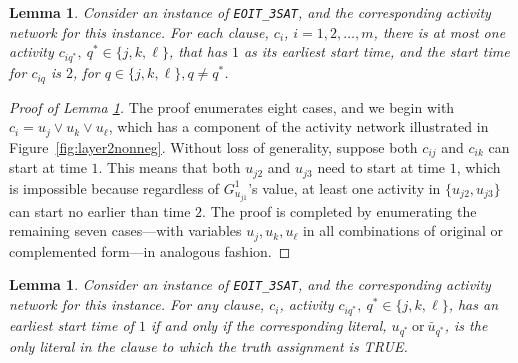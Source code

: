 \documentclass[11pt]{article}
\newtheorem{lemma}[theorem]{Lemma}
\begin{document}
	\begin{lemma} \label{lemma:onlyOne}
		Consider an instance of \verb|EOIT_3SAT|, and the corresponding activity network for this instance.
		For each clause, \(c_i\), 
		\(i = 1,2,\dots,m\), there is at most one activity \(c_{iq^*},\ q^* \in \{j,k,\ell\}\), that has $1$ as its earliest start time, and the start time for \(c_{iq}\) is \(2\), for \(q \in \{j,k,\ell\}, q \neq q^*\).
	\end{lemma}
	\begin{proof}[Proof of Lemma \ref{lemma:onlyOne}]
		The proof enumerates eight cases, and we begin with $c_i=u_j \vee u_k \vee u_\ell$, which has a component of the activity network illustrated in Figure~\ref{fig:layer2nonneg}. Without loss of generality, suppose both \(c_{ij}\) and \(c_{ik}\) can start at time \(1\). This means that both \(u_{j2}\) and \(u_{j3}\) need to start at time \(1\), which is impossible because regardless of \(G^1_{u_{j1}}\)'s value, at least one activity in \(\{u_{j2},u_{j3}\}\) can start no earlier than time \(2\). The proof is completed by enumerating the remaining seven cases---with variables $u_j, u_k, u_\ell$ in all combinations of original or complemented form---in analogous fashion.
	\end{proof}
	\begin{lemma} \label{lemma:iff}
		Consider an instance of \verb|EOIT_3SAT|, and the corresponding activity network for this instance.
		For any clause, \(c_i\), 
		activity \(c_{iq^*},\ q^* \in \{j,k,\ell\}\), has an earliest start time of \(1\) if and only if the corresponding {literal}, \(u_{q^*} \ \mbox{or} \ \bar{u}_{q^*} \), is the only {literal} in the clause to which the truth assignment is TRUE.
	\end{lemma}
\end{document}
